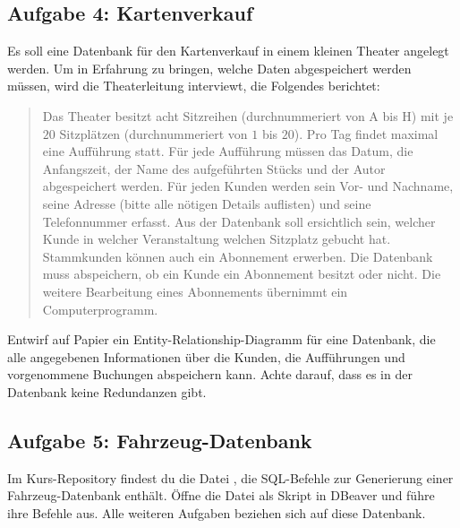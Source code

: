\subsection{Aufgabe 4: Kartenverkauf}

Es soll eine Datenbank für den Kartenverkauf in einem kleinen Theater angelegt
werden. Um in Erfahrung zu bringen, welche Daten abgespeichert werden müssen,
wird die Theaterleitung interviewt, die Folgendes berichtet:

\begin{quotation}
\noindent
Das Theater besitzt acht Sitzreihen (durchnummeriert von A bis H) mit je $20$
Sitzplätzen (durchnummeriert von $1$ bis $20$). Pro Tag findet maximal eine
Aufführung statt. Für jede Aufführung müssen das Datum, die Anfangszeit, der
Name des aufgeführten Stücks und der Autor abgespeichert werden. Für jeden
Kunden werden sein Vor- und Nachname, seine Adresse (bitte alle nötigen Details
auflisten) und seine Telefonnummer erfasst. Aus der Datenbank soll ersichtlich
sein, welcher Kunde in welcher Veranstaltung welchen Sitzplatz gebucht hat.
Stammkunden können auch ein Abonnement erwerben. Die Datenbank muss
abspeichern, ob ein Kunde ein Abonnement besitzt oder nicht. Die weitere
Bearbeitung eines Abonnements übernimmt ein Computerprogramm.
\end{quotation}

Entwirf auf Papier ein Entity-Relationship-Diagramm für eine Datenbank, die
alle angegebenen Informationen über die Kunden, die Aufführungen und
vorgenommene Buchungen abspeichern kann. Achte darauf, dass es in der Datenbank
keine Redundanzen gibt.


\subsection{Aufgabe 5: Fahrzeug-Datenbank}

Im Kurs-Repository findest du die Datei , die SQL-Befehle
zur Generierung einer Fahrzeug-Datenbank enthält. Öffne die Datei als Skript in
DBeaver und führe ihre Befehle aus. Alle weiteren Aufgaben beziehen sich auf
diese Datenbank.


